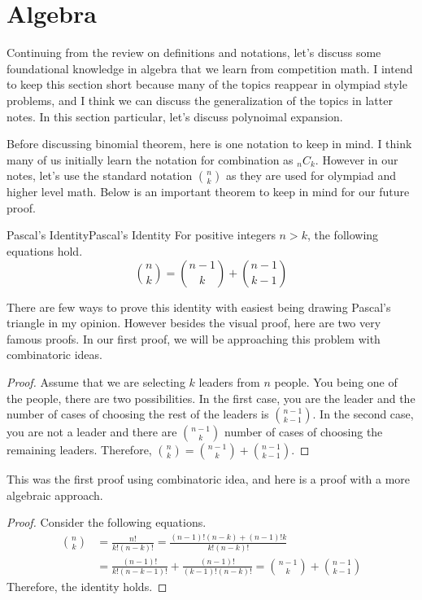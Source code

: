 \documentclass[../../../main.tex]{subfiles}
\begin{document}
\section{Algebra}

Continuing from the review on definitions and notations,
let's discuss some foundational knowledge in algebra that we learn
from competition math. I intend to keep this section short because
many of the topics reappear in olympiad style problems, and I think
we can discuss the generalization of the topics in latter notes.
In this section particular, let's discuss polynoimal expansion.

Before discussing binomial theorem, here is one notation to keep
in mind. I think many of us initially learn the notation for
combination as ${}_nC_k$. However in our notes, let's use the
standard notation $\binom{n}{k}$ as they are used for olympiad and
higher level math. Below is an important theorem to keep in mind for
our future proof.

\begin{theorem}{Pascal's Identity}{Pascal's Identity}
For positive integers $n > k$, the following equations hold.
\[
\binom{n}{k} = \binom{n-1}{k} + \binom{n-1}{k-1}
\]
\end{theorem}

There are few ways to prove this identity with easiest being drawing
Pascal's triangle in my opinion. However besides the visual proof,
here are two very famous proofs. In our first proof, we will be
approaching this problem with combinatoric ideas.

\begin{proof}
Assume that we are selecting $k$ leaders from $n$ people. You being
one of the people, there are two possibilities. In the first case,
you are the leader and the number of cases of choosing the rest of
the leaders is $\binom{n-1}{k-1}$. In the second case, you are not
a leader and there are $\binom{n-1}{k}$ number of cases of choosing
the remaining leaders. Therefore, $\binom{n}{k} = \binom{n-1}{k} +
\binom{n-1}{k-1}$.
\end{proof}

This was the first proof using combinatoric idea, and here is a proof
with a more algebraic approach.

\begin{proof}
Consider the following equations.
\begin{align*}
    \binom{n}{k}
    &= \frac{n!}{k! (n-k)!}
    = \frac{(n-1)! (n-k) + (n-1)! k}{k! (n-k)!} \\
    &= \frac{(n-1)!}{k! (n-k-1)!} + \frac{(n-1)!}{(k-1)! (n-k)!}
    = \binom{n-1}{k} + \binom{n-1}{k-1}
\end{align*}
Therefore, the identity holds.
\end{proof}
\end{document}

